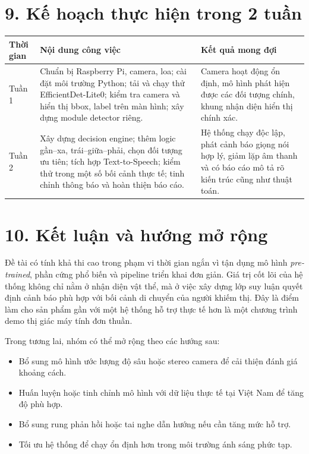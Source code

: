 \documentclass[11pt, a4paper]{article}
\begin{document}
\section*{9. Kế hoạch thực hiện trong 2 tuần}
\begin{center}
\begin{tabularx}{\textwidth}{|p{2cm}|X|X|}
\hline
\textbf{Thời gian} & \textbf{Nội dung công việc} & \textbf{Kết quả mong đợi} \\ \hline
Tuần 1 & Chuẩn bị Raspberry Pi, camera, loa; cài đặt môi trường Python; tải và chạy thử EfficientDet-Lite0; kiểm tra camera và hiển thị bbox, label trên màn hình; xây dựng module detector riêng. & Camera hoạt động ổn định, mô hình phát hiện được các đối tượng chính, khung nhận diện hiển thị chính xác. \\ \hline
Tuần 2 & Xây dựng decision engine; thêm logic gần--xa, trái--giữa--phải, chọn đối tượng ưu tiên; tích hợp Text-to-Speech; kiểm thử trong một số bối cảnh thực tế; tinh chỉnh thông báo và hoàn thiện báo cáo. & Hệ thống chạy độc lập, phát cảnh báo giọng nói hợp lý, giảm lặp âm thanh và có báo cáo mô tả rõ kiến trúc cũng như thuật toán. \\ \hline
\end{tabularx}
\end{center}

\section*{10. Kết luận và hướng mở rộng}
Đề tài có tính khả thi cao trong phạm vi thời gian ngắn vì tận dụng mô hình \textit{pre-trained}, phần cứng phổ biến và pipeline triển khai đơn giản. Giá trị cốt lõi của hệ thống không chỉ nằm ở nhận diện vật thể, mà ở việc xây dựng lớp suy luận quyết định cảnh báo phù hợp với bối cảnh di chuyển của người khiếm thị. Đây là điểm làm cho sản phẩm gần với một hệ thống hỗ trợ thực tế hơn là một chương trình demo thị giác máy tính đơn thuần.

Trong tương lai, nhóm có thể mở rộng theo các hướng sau:
\begin{itemize}
    \item Bổ sung mô hình ước lượng độ sâu hoặc stereo camera để cải thiện đánh giá khoảng cách.
    \item Huấn luyện hoặc tinh chỉnh mô hình với dữ liệu thực tế tại Việt Nam để tăng độ phù hợp.
    \item Bổ sung rung phản hồi hoặc tai nghe dẫn hướng nếu cần tăng mức hỗ trợ.
    \item Tối ưu hệ thống để chạy ổn định hơn trong môi trường ánh sáng phức tạp.
\end{itemize}
\end{document}
